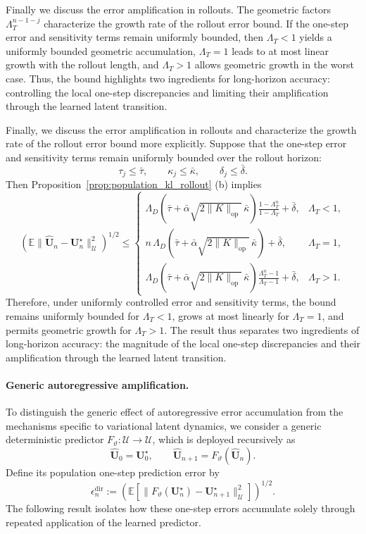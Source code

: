 \documentclass[11pt]{article}
\begin{document}
\begin{remark}
Finally we discuss the error amplification in rollouts. The geometric factors $\Lambda_T^{n-1-j}$ characterize the growth rate of the rollout error bound. If the one-step error and sensitivity terms remain uniformly bounded, then $\Lambda_T<1$ yields a uniformly bounded geometric accumulation, $\Lambda_T=1$ leads to at most linear growth with the rollout length, and $\Lambda_T>1$ allows geometric growth in the worst case. Thus, the bound highlights two ingredients for long-horizon accuracy: controlling the local one-step discrepancies and limiting their amplification through the learned latent transition.


Finally, we discuss the error amplification in rollouts and characterize the growth rate of the rollout error bound more explicitly. Suppose that the one-step error and sensitivity terms remain uniformly bounded over the rollout horizon:
\[
\tau_j \leq \bar{\tau}, \qquad
\kappa_j \leq \bar{\kappa}, \qquad
\delta_j \leq \bar{\delta}.
\]
Then Proposition~\ref{prop:population_kl_rollout} (b) implies
\[
\left(
\mathbb{E}
\|\widehat{\mathbf{U}}_n - \mathbf{U}_n^\star\|_{\mathcal{U}}^2
\right)^{1/2}
\leq
\begin{cases}
\displaystyle
\Lambda_D
\left(
\bar{\tau}
+
\bar{\alpha}\sqrt{2\|K\|_{\mathrm{op}}}\,\bar{\kappa}
\right)
\frac{1-\Lambda_T^n}{1-\Lambda_T}
+\bar{\delta},
& \Lambda_T < 1,\\[1.2em]
\displaystyle
n\,\Lambda_D
\left(
\bar{\tau}
+
\bar{\alpha}\sqrt{2\|K\|_{\mathrm{op}}}\,\bar{\kappa}
\right)
+\bar{\delta},
& \Lambda_T = 1,\\[1.2em]
\displaystyle
\Lambda_D
\left(
\bar{\tau}
+
\bar{\alpha}\sqrt{2\|K\|_{\mathrm{op}}}\,\bar{\kappa}
\right)
\frac{\Lambda_T^n - 1}{\Lambda_T - 1}
+\bar{\delta},
& \Lambda_T > 1.
\end{cases}
\]
Therefore, under uniformly controlled error and sensitivity terms, the bound remains uniformly bounded for $\Lambda_T < 1$, grows at most linearly for $\Lambda_T = 1$, and permits geometric growth for $\Lambda_T > 1$. The result thus separates two ingredients of long-horizon accuracy: the magnitude of the local one-step discrepancies and their amplification through the learned latent transition.
\end{remark}

\paragraph{Generic autoregressive amplification.} To distinguish the generic effect of autoregressive error accumulation from the mechanisms specific to variational latent dynamics, we consider a generic deterministic predictor $F_\vartheta:\mathcal U\to\mathcal U$, which is deployed recursively as
\[
\widehat{\mathbf U}_0=\mathbf U_0^\star,
\qquad
\widehat{\mathbf U}_{n+1}
=
F_\vartheta(\widehat{\mathbf U}_n).
\]
Define its population one-step prediction error by
\[
\epsilon_n^{\mathrm{dir}}
:=
\left(\mathbb E
\left[\|F_\vartheta(\mathbf U_n^\star)-\mathbf U_{n+1}^\star\|_{\mathcal U}^2\right]\right)^{1/2}.
\]
The following result isolates how these one-step errors accumulate solely through repeated application of the learned predictor.
\end{document}
